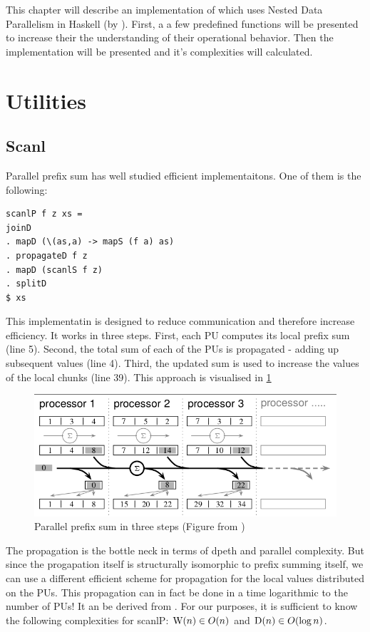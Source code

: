 \label{chapter:ndpn}

This chapter will describe an implementation of \algo which uses
Nested Data Parallelism in Haskell (by \cite{Harness2008}).
First, a a few predefined functions will be presented to
increase their the understanding of their operational behavior.
Then the implementation will be presented and it's complexities will
calculated.

\section{Utilities}

  \subsection{Scanl}
    Parallel prefix sum has well studied efficient implementaitons. One of them
    is the following:
    \begin{lstlisting}   
scanlP f z xs =
joinD
. mapD (\(as,a) -> mapS (f a) as)
. propagateD f z
. mapD (scanlS f z)
. splitD
$ xs
    \end{lstlisting}
    This implementatin is designed to reduce communication
    and therefore increase efficiency. It works in three steps.
    First, each PU computes its local prefix sum (line 5).
    Second, the total sum of each of the PUs is propagated
    - adding up subsequent values (line 4).
    Third, the updated sum is used to increase the values of the local chunks (line 39).
    This approach is visualised in \ref{figure:scanlPsteps}
    
    \begin{figure}[h!]
        \includegraphics[width=\linewidth]{scanlP-three-steps.png}
        \caption{Parallel prefix sum in three steps (Figure from \cite{DistTypes1999}) }
        \label{figure:scanlPsteps}
    \end{figure}
    The propagation is the bottle neck in terms of dpeth and parallel complexity.
    But since the progapation itself is structurally isomorphic to prefix summing itself,
    we can use a different efficient scheme for propagation for the local values distributed on the PUs.
    This propagation can in fact be done in a time logarithmic to the number of PUs!
    It an be derived from \cite{Scanl1980}. For our purposes, it is sufficient to know the following complexities for scanlP:
    $\textrm{W}(n) \in O(n)$ and $\textrm{D}(n) \in O(\log n)$.

